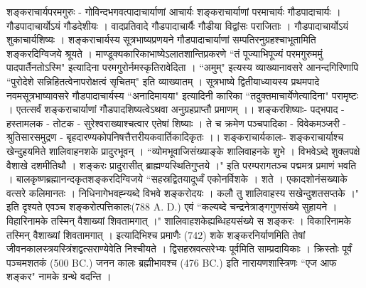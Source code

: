 शङ्कराचार्यपरमगुरुः -
गोविन्दभगवत्पादाचार्याणां आचार्यः शङ्कराचार्याणां परमाचार्यः गौडपादाचार्यः । गौडपादाचार्योऽयं गौडदेशीयः । वादप्रतिवादे गौडपादाचार्यैः गौडीया विद्वांसः पराजिताः । गौडपादाचार्योऽयं शुकाचार्यशिष्यः । शङ्कराचार्यस्य सूत्रभाष्यप्रणयने गौडपादाचार्याणां सम्पतिरनुग्रहश्चाभूतामिति शङ्करदिग्विजये श्रूयते । माण्डूक्यकारिकाभाष्येऽलातशान्तिप्रकरणे ``तं पूज्याभिपूज्यं परमगुरुममुं पादपार्तैनतोऽस्मि" इत्यादिना परमगुरोर्नमस्कृतिरावेदिता । ``अमुम्" इत्यस्य व्याख्यानावसरे आनन्दगिरिणापि ``पुरोदेशे सन्निहितत्वेनापरोक्षत्वं सृचितम्" इति व्याख्यातम् । सूत्रभाष्ये द्वितीयाध्यायस्य प्रथमपादे नवमसूत्रभाष्यावसरे गौडपादाचार्यस्य ``अनादिमायया" इत्यादिनी कारिका ``तदुक्तमाचार्येणेत्यादिना" परामृष्टः । एतत्सर्वं शङ्कराचार्याणां गौडपादशिष्यत्वेऽथवा अनुग्रहप्राप्तौ प्रमाणम् ।।
शङ्करशिष्याः-
पद्भपाद - हस्तामलक - तोटक - सुरेश्वराख्याश्चत्वार एतेषां शिष्याः । ते च क्रमेण पञ्चपादिका - विवेकमञ्जरी - श्रुतिसारसमुद्रण - बृहदारण्यकोपनिषत्तैत्तरीयकवार्तिकादिकृतः ।।
शङ्कराचार्यकालः- 
शङ्कराचार्याश्च खेन्दुहयमिते शालिवाहनशके प्रादुरभूवन् । ``व्योमभूवाजिसंख्याङ्के शालिवाहनके शुभे । विभवेऽब्दे शुक्लपक्षे वैशाखे दशमीतिथौ । शङ्करः प्रादुरासीत् ब्राह्मण्यस्थितिगुप्तये ।" इति परम्परागतञ्च पद्ममत्र प्रमाणं भवति । बालकृष्णब्रह्मानन्दकृतशङ्करदिग्विजये ``सहस्रद्वितयादूर्ध्वं एकोनर्विशके । शते । एकादशोनंसख्याके वत्सरे कलिमानतः । निधिनागेभवह्न्यब्दे विभवे शङ्करोदयः । कलौ तु शालिवाहस्य सखेन्दुशतसप्तके ।" इति दृश्यते एवञ्च शङ्करोत्पत्तिकालः(788 A. D.) एवं ``कल्यब्दे चन्द्रनेत्राङ्गगुणसंख्ये सुहायने । विहारिनामके तस्मिन् वैशाख्यां शिवतामगात् ।" शालिवाहशकेह्यब्धिहयसंख्ये स शङ्करः । विकारिनामके तस्मिन् वैशाख्यां शिवतामगात् । इत्यादिभिश्च प्रमाणैः (742) शके शङ्करनिर्याणमिति तेषां जीवनकालस्त्रयस्त्रिंशद्वत्सराण्येवेति निश्चीयते । द्विसहस्रवत्सरेभ्यः पूर्वमिति साम्प्रदायिकाः । क्रिस्तोः पूर्वं पञ्चमशतकं (500 BC.) जनन कालः ब्रह्मीभावश्च (476 BC.) इति नारायणशास्त्रिणः ``एज आफ शङ्कर" नामके ग्रन्थे वदन्ति ।
